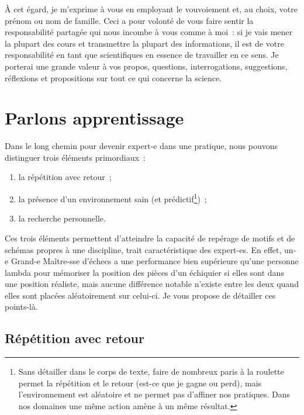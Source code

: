 \documentclass[a4paper, 10pt, final, garamond]{book}
\begin{document}
À cet égard, je m'exprime à vous en employant le vouvoiement et, au choix, votre
prénom ou nom de famille. Ceci a pour volonté de vous faire sentir la
responsabilité partagée qui nous incombe à vous comme à moi~: si je vais mener
la plupart des cours et transmettre la plupart des informations, il est de votre
responsabilité en tant que scientifiques en essence de travailler en ce sens. Je
porterai une grande valeur à vos propos, questions, interrogations, suggestions,
réflexions et propositions sur tout ce qui concerne la science.

\section{Parlons apprentissage}

Dans le long chemin pour devenir expert-e dans une pratique, nous pouvons
distinguer trois éléments primordiaux~:
\begin{enumerate}
	\item la répétition avec retour~;
	\item la présence d'un environnement sain (et prédictif\footnote{Sans
		      détailler dans le corps de texte, faire de nombreux paris à la
		      roulette permet la répétition et le retour (est-ce que je gagne ou
		      perd), mais l'environnement est aléatoire et ne permet pas d'affiner
		      nos pratiques. Dans nos domaines une même action amène à un même
		      résultat.})~;
	\item la recherche personnelle.
\end{enumerate}

Ces trois éléments permettent d'atteindre la capacité de repérage de motifs et
de schémas propres à une discipline, trait caractéristique des expert-es. En
effet, un-e Grand-e Maître-sse d'échecs a une performance bien supérieure qu'une
personne lambda pour mémoriser la position des pièces d'un échiquier si elles
sont dans une position réaliste, mais aucune différence notable n'existe entre
les deux quand elles sont placées aléatoirement sur celui-ci. Je vous propose de
détailler ces points-là.

\subsection{Répétition avec retour}
\end{document}
